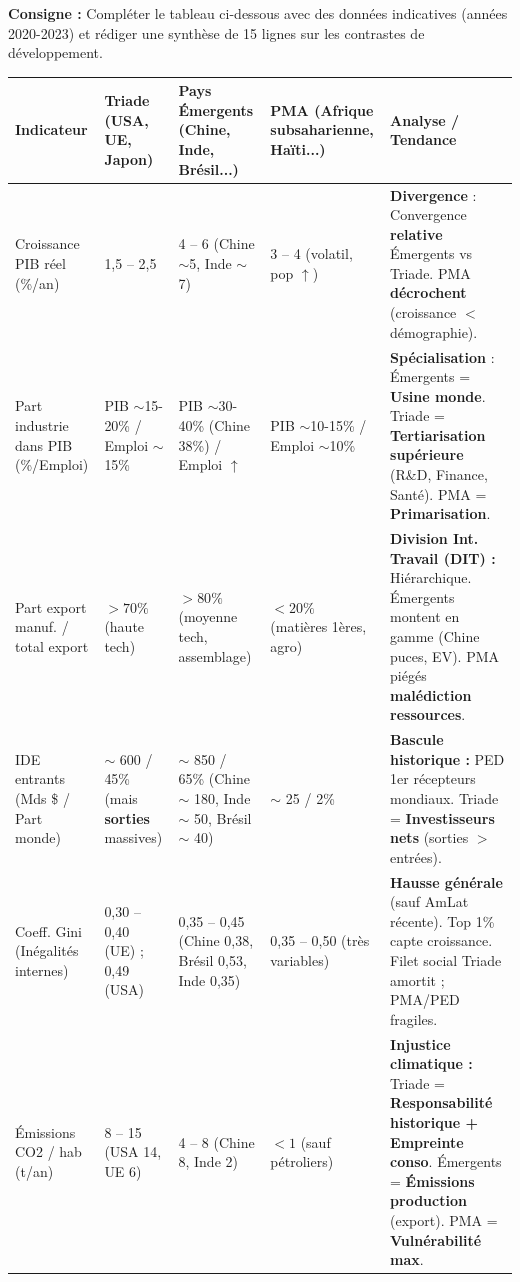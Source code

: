 \documentclass[11pt]{article}
\begin{document}
\begin{exoresolu}
    \textbf{Consigne :} Compléter le tableau ci-dessous avec des données indicatives (années 2020-2023) et rédiger une synthèse de 15 lignes sur les contrastes de développement.
    
    \begin{center}
        \begin{tabularx}{\linewidth}{|l|X|X|X|X|}\hline
        \rowcolor{popblueL}
        \textbf{Indicateur} & \textbf{Triade (USA, UE, Japon)} & \textbf{Pays Émergents (Chine, Inde, Brésil...)} & \textbf{PMA (Afrique subsaharienne, Haïti...)} & \textbf{Analyse / Tendance} \\ \hline
        Croissance PIB réel (\%/an) & 1,5 -- 2,5 & 4 -- 6 (Chine $\sim$5, Inde $\sim$7) & 3 -- 4 (volatil, pop $\uparrow$) & \textbf{Divergence} : Convergence \textbf{relative} Émergents vs Triade. PMA \textbf{décrochent} (croissance $<$ démographie). \\ \hline
        Part industrie dans PIB (\%/Emploi) & PIB $\sim$15-20\% / Emploi $\sim$15\% & PIB $\sim$30-40\% (Chine 38\%) / Emploi $\uparrow$ & PIB $\sim$10-15\% / Emploi $\sim$10\% & \textbf{Spécialisation} : Émergents = \textbf{Usine monde}. Triade = \textbf{Tertiarisation supérieure} (R\&D, Finance, Santé). PMA = \textbf{Primarisation}. \\ \hline
        Part export manuf. / total export & $> 70\%$ (haute tech) & $> 80\%$ (moyenne tech, assemblage) & $< 20\%$ (matières 1ères, agro) & \textbf{Division Int. Travail (DIT) :} Hiérarchique. Émergents montent en gamme (Chine puces, EV). PMA piégés \textbf{malédiction ressources}. \\ \hline
        IDE entrants (Mds \$ / Part monde) & $\sim$ 600 / 45\% (mais \textbf{sorties} massives) & $\sim$ 850 / 65\% (Chine $\sim$ 180, Inde $\sim$ 50, Brésil $\sim$ 40) & $\sim$ 25 / 2\% & \textbf{Bascule historique :} PED 1er récepteurs mondiaux. Triade = \textbf{Investisseurs nets} (sorties $>$ entrées). \\ \hline
        Coeff. Gini (Inégalités internes) & 0,30 -- 0,40 (UE) ; 0,49 (USA) & 0,35 -- 0,45 (Chine 0,38, Brésil 0,53, Inde 0,35) & 0,35 -- 0,50 (très variables) & \textbf{Hausse générale} (sauf AmLat récente). Top 1\% capte croissance. Filet social Triade amortit ; PMA/PED fragiles. \\ \hline
        Émissions CO2 / hab (t/an) & 8 -- 15 (USA 14, UE 6) & 4 -- 8 (Chine 8, Inde 2) & $< 1$ (sauf pétroliers) & \textbf{Injustice climatique :} Triade = \textbf{Responsabilité historique + Empreinte conso}. Émergents = \textbf{Émissions production} (export). PMA = \textbf{Vulnérabilité max}. \\ \hline
        \end{tabularx}
    \end{center}
    

\end{exoresolu}
\end{document}
